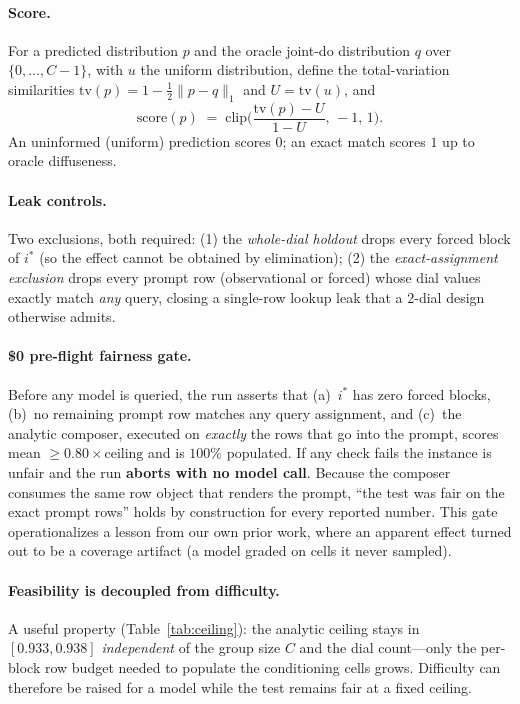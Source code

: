 \documentclass[11pt]{article}
\newcommand{\score}{\mathrm{score}}
\newcommand{\istar}{i^{\!*}}
\begin{document}
\paragraph{Score.} For a predicted distribution $p$ and the oracle joint-do distribution $q$ over
$\{0,\dots,C-1\}$, with $u$ the uniform distribution, define the total-variation similarities
$\mathrm{tv}(p)=1-\tfrac12\|p-q\|_1$ and $U=\mathrm{tv}(u)$, and
\begin{equation}
\score(p)\;=\;\mathrm{clip}\!\Big(\frac{\mathrm{tv}(p)-U}{1-U},\,-1,\,1\Big).
\end{equation}
An uninformed (uniform) prediction scores $0$; an exact match scores $1$ up to oracle diffuseness.

\paragraph{Leak controls.} Two exclusions, both required: (1) the \emph{whole-dial holdout} drops every
forced block of $\istar$ (so the effect cannot be obtained by elimination); (2) the
\emph{exact-assignment exclusion} drops every prompt row (observational or forced) whose dial values
exactly match \emph{any} query, closing a single-row lookup leak that a $2$-dial design otherwise admits.

\paragraph{\$0 pre-flight fairness gate.} Before any model is queried, the run asserts that
(a)~$\istar$ has zero forced blocks, (b)~no remaining prompt row matches any query assignment, and
(c)~the analytic composer, executed on \emph{exactly} the rows that go into the prompt, scores mean
$\geq 0.80\times\text{ceiling}$ and is $100\%$ populated. If any check fails the instance is unfair and the
run \textbf{aborts with no model call}. Because the composer consumes the same row object that renders the
prompt, ``the test was fair on the exact prompt rows'' holds by construction for every reported number.
This gate operationalizes a lesson from our own prior work, where an apparent effect turned out to be a
coverage artifact (a model graded on cells it never sampled).

\paragraph{Feasibility is decoupled from difficulty.} A useful property (Table~\ref{tab:ceiling}): the
analytic ceiling stays in $[0.933,0.938]$ \emph{independent} of the group size $C$ and the dial count---only
the per-block row budget needed to populate the conditioning cells grows. Difficulty can therefore be raised
for a model while the test remains fair at a fixed ceiling.
\end{document}
